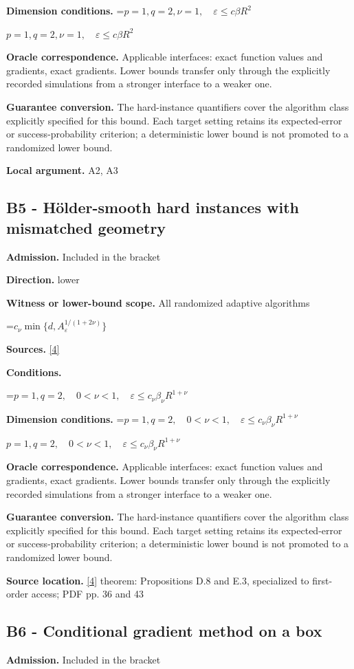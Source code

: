 \documentclass[10pt,a4paper]{article}
\newcommand{\AtlasMath}[1]{\par\begingroup\centering\setbox0=\hbox{$\displaystyle #1$}\ifdim\wd0>1.4\linewidth\typeout{ATLAS WIDE FORMULA: \the\wd0}\fi\ifdim\wd0>\linewidth\resizebox{\linewidth}{!}{\box0}\else\box0\fi\par\endgroup}
\newcommand{\AtlasInlineMath}[1]{\begingroup\setbox0=\hbox{$#1$}\ifdim\wd0>.4\linewidth\endgroup\AtlasMath{#1}\else\endgroup$#1$\fi}
\begin{document}
\textbf{Dimension conditions.} \AtlasInlineMath{p=1,q=2,\nu=1,\quad\varepsilon\le c\beta R^2}

\textbf{Oracle correspondence.} Applicable interfaces: exact function values and gradients, exact gradients. Lower bounds transfer only through the explicitly recorded simulations from a stronger interface to a weaker one.

\textbf{Guarantee conversion.} The hard-instance quantifiers cover the algorithm class explicitly specified for this bound. Each target setting retains its expected-error or success-probability criterion; a deterministic lower bound is not promoted to a randomized lower bound.

\textbf{Local argument.} A2, A3

\subsection{B5 - Hölder-smooth hard instances with mismatched geometry}
\textbf{Admission.} Included in the bracket

\textbf{Direction.} lower

\textbf{Witness or lower-bound scope.} All randomized adaptive algorithms

\AtlasMath{c_\nu\min\{d,A_\varepsilon^{1/(1+2\nu)}\}}
\textbf{Sources.} \href{https://arxiv.org/pdf/2609.32910}{[4]}

\textbf{Conditions.} 
\AtlasMath{p=1,q=2,\quad0<\nu<1,\quad\varepsilon\le c_\nu\beta_\nu R^{1+\nu}}


\textbf{Dimension conditions.} \AtlasInlineMath{p=1,q=2,\quad0<\nu<1,\quad\varepsilon\le c_\nu\beta_\nu R^{1+\nu}}

\textbf{Oracle correspondence.} Applicable interfaces: exact function values and gradients, exact gradients. Lower bounds transfer only through the explicitly recorded simulations from a stronger interface to a weaker one.

\textbf{Guarantee conversion.} The hard-instance quantifiers cover the algorithm class explicitly specified for this bound. Each target setting retains its expected-error or success-probability criterion; a deterministic lower bound is not promoted to a randomized lower bound.

\textbf{Source location.} \href{https://arxiv.org/pdf/2609.32910}{[4]} theorem: Propositions D.8 and E.3, specialized to first-order access; PDF pp. 36 and 43

\subsection{B6 - Conditional gradient method on a box}
\textbf{Admission.} Included in the bracket
\end{document}
